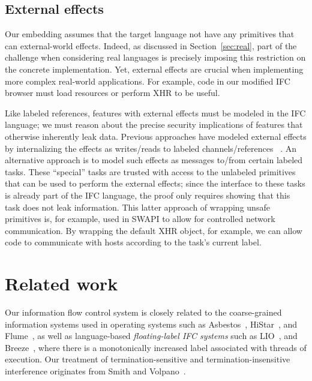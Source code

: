 \documentclass{sigplanconf}
\newcommand{\Red}[1]{{\color{red} #1}}
\newcommand{\tocite}[1]{\Red{\cite{#1}}}
\begin{document}
\subsection{External effects}
\label{sec:extensions:external}
Our embedding assumes that the target language not have any
primitives that can external-world effects.
%
Indeed, as discussed in Section~\ref{sec:real}, part of the challenge
when considering real languages is precisely imposing this restriction
on the concrete implementation.
%
Yet, external effects are crucial when implementing more complex
real-world applications.
%
For example, code in our modified IFC browser must load resources or
perform XHR to be useful.

Like labeled references, features with external effects must be
modeled in the IFC language; we must reason about the precise security
implications of features that otherwise inherently leak data.
%
Previous approaches have modeled external effects by internalizing the
effects as writes/reads to labeled channels/references~\tocite{}.
%
An alternative approach is to model such effects as messages to/from
certain labeled tasks.
%
These ``special'' tasks are trusted with access to the unlabeled
primitives that can be used to perform the external effects; since the
interface to these tasks is already part of the IFC language, the
proof only requires showing that this task does not leak information.
%
This latter approach of wrapping unsafe primitives is, for example,
used in SWAPI to allow for controlled network communication.
%
By wrapping the default XHR object, for example, we can allow code
to communicate with hosts according to the task's current label.
\section{Related work}
\label{sec:related}




Our information flow control system is closely related
to the coarse-grained information systems used in operating systems such
as Asbestos~\cite{efstathopoulos:asbestos}, 
HiStar~\cite{Zeldovich:2006}, and Flume~\cite{krohn:flume}, as well as language-based
\emph{floating-label IFC systems} such as LIO~\cite{lio},
and Breeze~\cite{Hritcu:2013:YIB:2497621.2498098}, where there is a
monotonically increased label
associated with threads of execution.
Our treatment of termination-sensitive and termination-insensitive interference
originates from Smith and Volpano~\cite{Smith:Volpano:MultiThreaded,Volpano:1997:ECF:794197.795081}.
\end{document}

